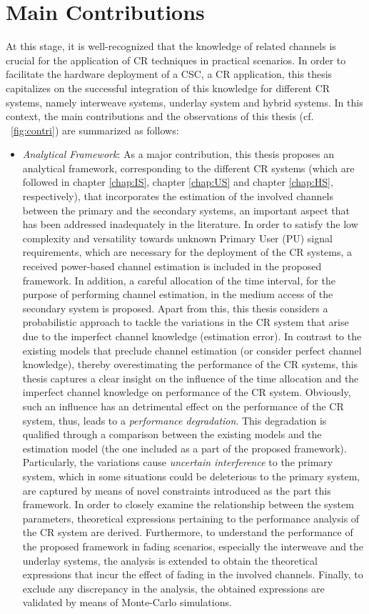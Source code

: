 \section{Main Contributions}
At this stage, it is well-recognized that the knowledge of related channels is crucial for the application of CR techniques in practical scenarios. In order to facilitate the hardware deployment of a CSC, a CR application, this thesis capitalizes on the successful integration of this knowledge for different CR systems, namely interweave systems, underlay system and hybrid systems. In this context, the main contributions and the observations of this thesis (cf. \figurename~\ref{fig:contri}) are summarized as follows:
\begin{itemize}
\item \textit{Analytical Framework}: 
As a major contribution, this thesis proposes an analytical framework, corresponding to the different CR systems (which are followed in chapter \ref{chap:IS}, chapter \ref{chap:US} and chapter \ref{chap:HS}, respectively), that incorporates the estimation of the involved channels between the primary and the secondary systems, an important aspect that has been addressed inadequately in the literature. In order to satisfy the low complexity and versatility towards unknown Primary User (PU) signal requirements, which are necessary for the deployment of the CR systems, a received power-based channel estimation is included in the proposed framework. In addition, a careful allocation of the time interval, for the purpose of performing channel estimation, in the medium access of the secondary system is proposed. Apart from this, this thesis considers a probabilistic approach to tackle the variations in the CR system that arise due to the imperfect channel knowledge (estimation error). In contrast to the existing models that preclude channel estimation (or consider perfect channel knowledge), thereby overestimating the performance of the CR systems, this thesis captures a clear insight on the influence of the time allocation and the imperfect channel knowledge on performance of the CR system. Obviously, such an influence has an detrimental effect on the performance of the CR system, thus, leads to a \textit{performance degradation}. This degradation is qualified through a comparison between the existing models and the estimation model (the one included as a part of the proposed framework). Particularly, the variations cause \textit{uncertain interference} to the primary system, which in some situations could be deleterious to the primary system, are captured by means of novel constraints introduced as the part this framework. In order to closely examine the relationship between the system parameters, theoretical expressions pertaining to the performance analysis of the CR system are derived. Furthermore, to understand the performance of the proposed framework in fading scenarios, especially the interweave and the underlay systems, the analysis is extended to obtain the theoretical expressions that incur the effect of fading in the involved channels. Finally, to exclude any discrepancy in the analysis, the obtained expressions are validated by means of Monte-Carlo simulations. 

\end{itemize}
